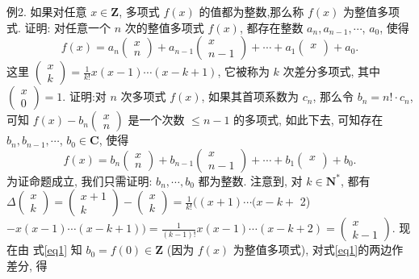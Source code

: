 例2. 如果对任意 $x \in \mathbf{Z}$, 多项式 $f(x)$ 的值都为整数,那么称 $f(x)$ 为整值多项式.
证明: 对任意一个 $n$ 次的整值多项式 $f(x)$, 都存在整数 $a_n, a_{n-1}, \cdots$, $a_0$, 使得
$$
f(x)=a_n\left(\begin{array}{l}
x \\
n
\end{array}\right)+a_{n-1}\left(\begin{array}{c}
x \\
n-1
\end{array}\right)+\cdots+a_1\left(\begin{array}{l}
x \\
\end{array}\right)+a_0 .
$$
这里 $\left(\begin{array}{l}x \\ k\end{array}\right)=\frac{1}{k !} x(x-1) \cdots(x-k+1)$, 它被称为 $k$ 次差分多项式, 其中 $\left(\begin{array}{l}x \\ 0\end{array}\right)=1$.
证明:对 $n$ 次多项式 $f(x)$, 如果其首项系数为 $c_n$, 那么令 $b_n=n ! \cdot c_n$, 可知 $f(x)-b_n\left(\begin{array}{l}x \\ n\end{array}\right)$ 是一个次数 $\leqslant n-1$ 的多项式, 如此下去, 可知存在 $b_n, b_{n-1}, \cdots$, $b_0 \in \mathbf{C}$, 使得
$$
f(x)=b_n\left(\begin{array}{l}
x \\
n
\end{array}\right)+b_{n-1}\left(\begin{array}{c}
x \\
n-1
\end{array}\right)+\cdots+b_1\left(\begin{array}{l}
x \\
\end{array}\right)+b_0 . \label{eq1}
$$
为证命题成立, 我们只需证明: $b_n, \cdots, b_0$ 都为整数.
注意到, 对 $k \in \mathbf{N}^*$, 都有 $\Delta\left(\begin{array}{l}x \\ k\end{array}\right)=\left(\begin{array}{c}x+1 \\ k\end{array}\right)-\left(\begin{array}{l}x \\ k\end{array}\right)=\frac{1}{k !}((x+1) \cdots(x-k+$ 2) $-x(x-1) \cdots(x-k+1))=\frac{1}{(k-1) !} x(x-1) \cdots(x-k+2)=\left(\begin{array}{c}x \\ k-1\end{array}\right)$. 现在由 式\ref{eq1} 知 $b_0=f(0) \in \mathbf{Z}$ (因为 $f(x)$ 为整值多项式), 对式\ref{eq1}的两边作差分, 得
